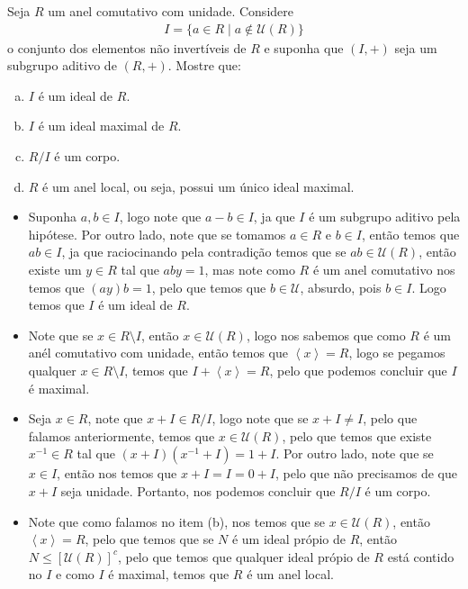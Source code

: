 \begin{homeworkProblem}[7]
  Seja $R$ um anel comutativo com unidade. Considere 
  \begin{align*}
    I = \{a \in R \mid a \notin \mathcal{U}(R)\}
  \end{align*}
  o conjunto dos elementos não invertíveis de $R$ e suponha que $(I, +)$ seja um subgrupo aditivo de $(R, +)$. Mostre que:
  \begin{enumerate}[(a)]
    \item $I$ é um ideal de $R$.
    \item $I$ é um ideal maximal de $R$.
    \item $R/I$ é um corpo.
    \item $R$ é um anel local, ou seja, possui um único ideal maximal.
\end{enumerate}
  \begin{solution}
  \begin{itemize}
    \item Suponha $a,b\in I$, logo note que $a-b\in I$, ja que $I$ é um subgrupo aditivo pela hipótese. Por outro lado, note que se tomamos $a\in R$ e $b\in I$, então temos que $ab\in I$, ja que raciocinando pela contradição temos que se $ab\in\mathcal{U}(R)$, então existe um $y\in R$ tal que $aby=1$, mas note como $R$ é um anel comutativo nos temos que $(ay)b=1$, pelo que temos que $b\in\mathcal{U}$, absurdo, pois $b\in I$. Logo temos que $I$ é um ideal de $R$.
    \item Note que se $x\in R\setminus I$, então $x\in\mathcal{U}(R)$, logo nos sabemos que como $R$ é um anél comutativo com unidade, então temos que $\left\langle x \right\rangle=R$, logo se pegamos qualquer $x\in R\setminus I$, temos que $I+\left\langle x \right\rangle=R$, pelo que podemos concluir que $I$ é maximal.
    \item Seja $x\in R$, note que $x+I\in R/I$, logo note que se $x+I\neq I$, pelo que falamos anteriormente, temos que $x\in\mathcal{U}(R)$, pelo que temos que existe $x^{-1}\in R$ tal que $(x+I)(x^{-1}+I)=1+I$. Por outro lado, note que se $x\in I$, então nos temos que $x+I=I=0+I$, pelo que não precisamos de que $x+I$ seja unidade. Portanto, nos podemos concluir que $R/I$ é um corpo.
    \item Note que como falamos no item (b), nos temos que se $x\in\mathcal{U}(R)$, então $\left\langle x \right\rangle=R$, pelo que temos que se $N$ é um ideal própio de $R$, então $N\leq [\mathcal{U}(R)]^{c}$, pelo que temos que qualquer ideal própio de $R$ está contido no $I$ e como $I$ é maximal, temos que $R$ é um anel local. 
  \end{itemize}
  \end{solution}
\end{homeworkProblem}
